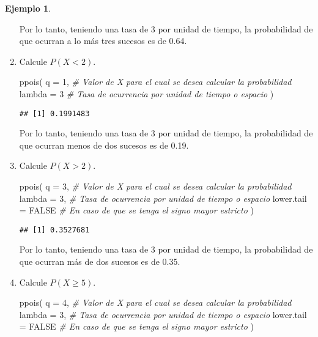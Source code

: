 \documentclass[
]{book}
\newenvironment{Shaded}{\begin{snugshade}}{\end{snugshade}}
\newcommand{\AttributeTok}[1]{\textcolor[rgb]{0.77,0.63,0.00}{#1}}
\newcommand{\CommentTok}[1]{\textcolor[rgb]{0.56,0.35,0.01}{\textit{#1}}}
\newcommand{\ConstantTok}[1]{\textcolor[rgb]{0.00,0.00,0.00}{#1}}
\newcommand{\DecValTok}[1]{\textcolor[rgb]{0.00,0.00,0.81}{#1}}
\newcommand{\FunctionTok}[1]{\textcolor[rgb]{0.00,0.00,0.00}{#1}}
\newcommand{\NormalTok}[1]{#1}
\theoremstyle{definition}
\theoremstyle{definition}
\newtheorem{example}{Ejemplo}[chapter]
\theoremstyle{definition}
\theoremstyle{definition}
\theoremstyle{remark}
\begin{document}
\begin{example}
\begin{enumerate}
  Por lo tanto, teniendo una tasa de 3 por unidad de tiempo, la probabilidad de que ocurran a lo más tres sucesos es de 0.64.
\item
  Calcule \(P(X < 2)\).

\begin{Shaded}
\begin{Highlighting}[]
\FunctionTok{ppois}\NormalTok{(}
  \AttributeTok{q =} \DecValTok{1}\NormalTok{, }\CommentTok{\# Valor de X para el cual se desea calcular la probabilidad}
  \AttributeTok{lambda =} \DecValTok{3} \CommentTok{\# Tasa de ocurrencia por unidad de tiempo o espacio}
\NormalTok{  )}
\end{Highlighting}
\end{Shaded}

\begin{verbatim}
## [1] 0.1991483
\end{verbatim}

  Por lo tanto, teniendo una tasa de 3 por unidad de tiempo, la probabilidad de que ocurran menos de dos sucesos es de 0.19.
\item
  Calcule \(P(X > 2)\).

\begin{Shaded}
\begin{Highlighting}[]
\FunctionTok{ppois}\NormalTok{(}
  \AttributeTok{q =} \DecValTok{3}\NormalTok{, }\CommentTok{\# Valor de X para el cual se desea calcular la probabilidad}
  \AttributeTok{lambda =} \DecValTok{3}\NormalTok{, }\CommentTok{\# Tasa de ocurrencia por unidad de tiempo o espacio}
  \AttributeTok{lower.tail =} \ConstantTok{FALSE} \CommentTok{\# En caso de que se tenga el signo mayor estricto}
\NormalTok{  )}
\end{Highlighting}
\end{Shaded}

\begin{verbatim}
## [1] 0.3527681
\end{verbatim}

  Por lo tanto, teniendo una tasa de 3 por unidad de tiempo, la probabilidad de que ocurran más de dos sucesos es de 0.35.
\item
  Calcule \(P(X\geq 5)\).

\begin{Shaded}
\begin{Highlighting}[]
\FunctionTok{ppois}\NormalTok{(}
  \AttributeTok{q =} \DecValTok{4}\NormalTok{, }\CommentTok{\# Valor de X para el cual se desea calcular la probabilidad}
  \AttributeTok{lambda =} \DecValTok{3}\NormalTok{, }\CommentTok{\# Tasa de ocurrencia por unidad de tiempo o espacio}
  \AttributeTok{lower.tail =} \ConstantTok{FALSE} \CommentTok{\# En caso de que se tenga el signo mayor estricto}
\NormalTok{  )}
\end{Highlighting}
\end{Shaded}


\end{enumerate}
\end{example}
\end{document}
